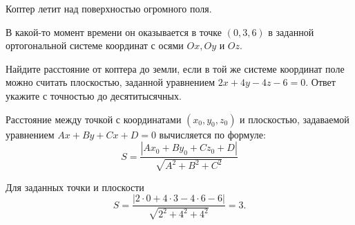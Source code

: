 
Коптер летит над поверхностью огромного поля. 

В какой-то момент времени он оказывается в точке $(0,3,6)$ в заданной ортогональной системе координат с осями $Ox, Oy$ и $Oz$. 

Найдите расстояние от коптера до земли, если в той же системе координат поле можно считать плоскостью, заданной уравнением $2x+4y-4z-6=0$. Ответ укажите с точностью до десятитысячных.

\solutionSection

Расстояние между точкой с координатами $(x_0, y_0, z_0)$ и плоскостью, задаваемой уравнением $Ax + By + Cx + D = 0$ вычисляется по формуле:
$$S = \frac{|Ax_0+By_0+Cz_0 + D|}{\sqrt{A^2+B^2+C^2}}$$

Для заданных точки и плоскости $$S = \frac{|2 \cdot 0 + 4 \cdot 3 - 4 \cdot 6 - 6|}{\sqrt{2^2 + 4^2 + 4^2}} = 3.$$

